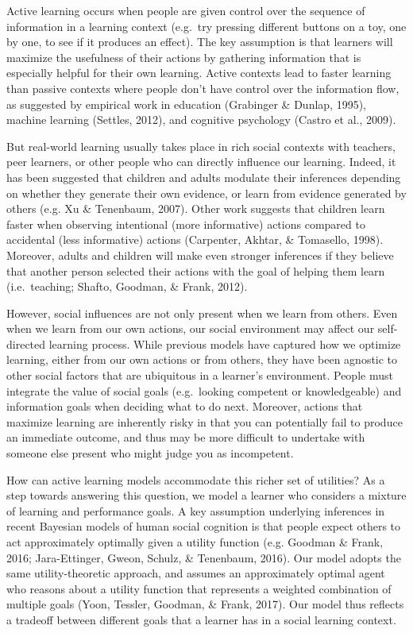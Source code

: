\documentclass[10pt, letterpaper]{article}
\begin{document}
Active learning occurs when people are given control over the sequence
of information in a learning context (e.g.~try pressing different
buttons on a toy, one by one, to see if it produces an effect). The key
assumption is that learners will maximize the usefulness of their
actions by gathering information that is especially helpful for their
own learning. Active contexts lead to faster learning than passive
contexts where people don't have control over the information flow, as
suggested by empirical work in education (Grabinger \& Dunlap, 1995),
machine learning (Settles, 2012), and cognitive psychology (Castro et
al., 2009).

But real-world learning usually takes place in rich social contexts with
teachers, peer learners, or other people who can directly influence our
learning. Indeed, it has been suggested that children and adults
modulate their inferences depending on whether they generate their own
evidence, or learn from evidence generated by others (e.g. Xu \&
Tenenbaum, 2007). Other work suggests that children learn faster when
observing intentional (more informative) actions compared to accidental
(less informative) actions (Carpenter, Akhtar, \& Tomasello, 1998).
Moreover, adults and children will make even stronger inferences if they
believe that another person selected their actions with the goal of
helping them learn (i.e.~teaching; Shafto, Goodman, \& Frank, 2012).

However, social influences are not only present when we learn from
others. Even when we learn from our own actions, our social environment
may affect our self-directed learning process. While previous models
have captured how we optimize learning, either from our own actions or
from others, they have been agnostic to other social factors that are
ubiquitous in a learner's environment. People must integrate the value
of social goals (e.g.~looking competent or knowledgeable) and
information goals when deciding what to do next. Moreover, actions that
maximize learning are inherently risky in that you can potentially fail
to produce an immediate outcome, and thus may be more difficult to
undertake with someone else present who might judge you as incompetent.

How can active learning models accommodate this richer set of utilities?
As a step towards answering this question, we model a learner who
considers a mixture of learning and performance goals. A key assumption
underlying inferences in recent Bayesian models of human social
cognition is that people expect others to act approximately optimally
given a utility function (e.g. Goodman \& Frank, 2016; Jara-Ettinger,
Gweon, Schulz, \& Tenenbaum, 2016). Our model adopts the same
utility-theoretic approach, and assumes an approximately optimal agent
who reasons about a utility function that represents a weighted
combination of multiple goals (Yoon, Tessler, Goodman, \& Frank, 2017).
Our model thus reflects a tradeoff between different goals that a
learner has in a social learning context.
\end{document}
